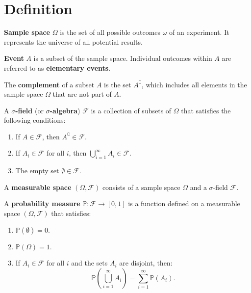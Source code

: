 \documentclass{huhtakm-template-book}
\newcommand{\prob}{\mathbb{P}}
\begin{document}
\section*{Definition}
    \begin{sdefn}
        \textbf{Sample space} $\Omega$ is the set of all possible outcomes $\omega$ of an experiment. It represents the universe of all potential results.
    \end{sdefn}
    \begin{sdefn}
        \textbf{Event} $A$ is a subset of the sample space. Individual outcomes within $A$ are referred to as \textbf{elementary events}.
    \end{sdefn}
    \begin{sdefn}
        The \textbf{complement} of a subset $A$ is the set $A^{\complement}$, which includes all elements in the sample space $\Omega$ that are not part of $A$.
    \end{sdefn}
    \begin{sdefn}
        A \textbf{$\sigma$-field} (or \textbf{$\sigma$-algebra}) $\mathcal{F}$ is a collection of subsets of $\Omega$ that satisfies the following conditions:
        \begin{enumerate}
            \item If $A\in\mathcal{F}$, then $A^{\complement}\in\mathcal{F}$.
            \item If $A_{i}\in\mathcal{F}$ for all $i$, then $\bigcup_{i=1}^{\infty}A_{i}\in\mathcal{F}$.
            \item The empty set $\emptyset\in\mathcal{F}$.
        \end{enumerate}
    \end{sdefn}
    \begin{sdefn}
        A \textbf{measurable space} $(\Omega, \mathcal{F})$ consists of a sample space $\Omega$ and a $\sigma$-field $\mathcal{F}$.
    \end{sdefn}
    \begin{sdefn}
        A \textbf{probability measure} $\prob: \mathcal{F} \to [0,1]$ is a function defined on a measurable space $(\Omega, \mathcal{F})$ that satisfies:
        \begin{enumerate}
            \item $\prob(\emptyset)=0$.
            \item $\prob(\Omega)=1$.
            \item If $A_{i}\in\mathcal{F}$ for all $i$ and the sets $A_{i}$ are disjoint, then:
            \begin{equation*}
                \prob\left(\bigcup_{i=1}^{\infty}A_{i}\right)=\sum_{i=1}^{\infty}\prob(A_{i}).
            \end{equation*}
        \end{enumerate}
    \end{sdefn}
\end{document}
